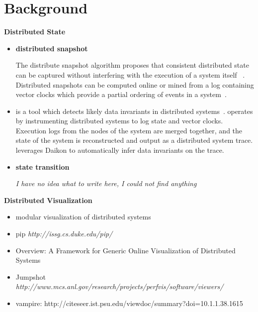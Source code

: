 \section{Background}
\label{sec:background}

\textbf{Distributed State}

\begin{itemize}
    \item \textbf{distributed snapshot}

The distribute snapshot algorithm proposes that consistent distributed state
can be captured without interfering with the execution of a system itself
~\cite{dist_snapshots_Chandy1985}. Distributed snapshots can be computed online
or mined from a log containing vector clocks which provide a partial ordering of events in a system~\cite{mattern_vector_clocks_1989}.

    \item \textbf{\dinv}

\dinv is a tool which detects likely data invariants in distributed
systems~\cite{dinv}. \dinv operates by instrumenting distributed systems to log
state and vector clocks. Execution logs from the nodes of the system are merged
together, and the state of the system is reconstructed and output as a
distributed system trace. \dinv leverages Daikon to automatically infer data
invariants on the trace.

    \item \textbf{state transition}

\textit{I have no idea what to write here, I could not find anything}

\end{itemize}


\textbf{Distributed Visualization}

\begin{itemize}

\item modular visualization of distributed systems

\item pip \textit{http://issg.cs.duke.edu/pip/}

\item Overview: A Framework for Generic Online Visualization of Distributed
Systems

\item Jumpshot \textit{http://www.mcs.anl.gov/research/projects/perfvis/software/viewers/}

\item vampire: http://citeseer.ist.psu.edu/viewdoc/summary?doi=10.1.1.38.1615

\end{itemize}

